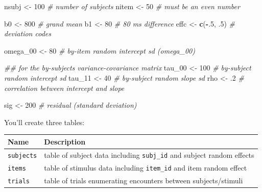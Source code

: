 \documentclass[]{book}
\newenvironment{Shaded}{\begin{snugshade}}{\end{snugshade}}
\newcommand{\CommentTok}[1]{\textcolor[rgb]{0.56,0.35,0.01}{\textit{#1}}}
\newcommand{\DecValTok}[1]{\textcolor[rgb]{0.00,0.00,0.81}{#1}}
\newcommand{\FloatTok}[1]{\textcolor[rgb]{0.00,0.00,0.81}{#1}}
\newcommand{\KeywordTok}[1]{\textcolor[rgb]{0.13,0.29,0.53}{\textbf{#1}}}
\newcommand{\NormalTok}[1]{#1}
\newcommand{\OperatorTok}[1]{\textcolor[rgb]{0.81,0.36,0.00}{\textbf{#1}}}
\newcommand{\StringTok}[1]{\textcolor[rgb]{0.31,0.60,0.02}{#1}}
\begin{document}
\begin{Shaded}
\begin{Highlighting}[]
\NormalTok{nsubj <-}\StringTok{ }\DecValTok{100} \CommentTok{# number of subjects}
\NormalTok{nitem <-}\StringTok{ }\DecValTok{50}  \CommentTok{# must be an even number}

\NormalTok{b0 <-}\StringTok{ }\DecValTok{800} \CommentTok{# grand mean}
\NormalTok{b1 <-}\StringTok{ }\DecValTok{80} \CommentTok{# 80 ms difference}
\NormalTok{effc <-}\StringTok{ }\KeywordTok{c}\NormalTok{(}\OperatorTok{-}\NormalTok{.}\DecValTok{5}\NormalTok{, }\FloatTok{.5}\NormalTok{) }\CommentTok{# deviation codes}

\NormalTok{omega_}\DecValTok{00}\NormalTok{ <-}\StringTok{ }\DecValTok{80} \CommentTok{# by-item random intercept sd (omega_00)}

\CommentTok{## for the by-subjects variance-covariance matrix}
\NormalTok{tau_}\DecValTok{00}\NormalTok{ <-}\StringTok{ }\DecValTok{100} \CommentTok{# by-subject random intercept sd}
\NormalTok{tau_}\DecValTok{11}\NormalTok{ <-}\StringTok{ }\DecValTok{40} \CommentTok{# by-subject random slope sd}
\NormalTok{rho <-}\StringTok{ }\FloatTok{.2} \CommentTok{# correlation between intercept and slope}

\NormalTok{sig <-}\StringTok{ }\DecValTok{200} \CommentTok{# residual (standard deviation)}
\end{Highlighting}
\end{Shaded}

You'll create three tables:

\begin{longtable}[]{@{}ll@{}}
\toprule
\begin{minipage}[b]{0.14\columnwidth}\raggedright
Name\strut
\end{minipage} & \begin{minipage}[b]{0.80\columnwidth}\raggedright
Description\strut
\end{minipage}\tabularnewline
\midrule
\endhead
\begin{minipage}[t]{0.14\columnwidth}\raggedright
\texttt{subjects}\strut
\end{minipage} & \begin{minipage}[t]{0.80\columnwidth}\raggedright
table of subject data including \texttt{subj\_id} and subject random effects\strut
\end{minipage}\tabularnewline
\begin{minipage}[t]{0.14\columnwidth}\raggedright
\texttt{items}\strut
\end{minipage} & \begin{minipage}[t]{0.80\columnwidth}\raggedright
table of stimulus data including \texttt{item\_id} and item random effect\strut
\end{minipage}\tabularnewline
\begin{minipage}[t]{0.14\columnwidth}\raggedright
\texttt{trials}\strut
\end{minipage} & \begin{minipage}[t]{0.80\columnwidth}\raggedright
table of trials enumerating encounters between subjects/stimuli\strut
\end{minipage}\tabularnewline
\bottomrule
\end{longtable}
\end{document}
